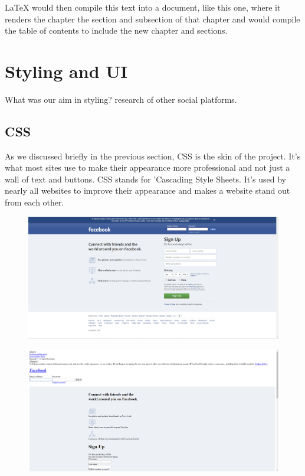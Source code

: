 LaTeX would then compile this text into a document, like this one, where it renders the chapter the section and subsection of that chapter and would compile the table of contents to include the new chapter and sections.

\section{Styling and UI}
What was our aim in styling? research of other social platforms.

\subsection{CSS}
As we discussed briefly in the previous section, CSS is the  skin of the project. It's what most sites use to make their appearance more professional and not just a wall of text and buttons. CSS stands for 'Cascading Style Sheets. It's used by nearly all websites to improve their appearance and makes a website stand out from each other.

\begin{figure}[H]
    \centering
    \begin{minipage}{.50\textwidth}
      \centering
      \includegraphics[width=.9\linewidth]{img/facebookCSS.PNG}
      \label{fig:aboutPC}
    \end{minipage}%
    \begin{minipage}{.50\textwidth}
      \centering
      \includegraphics[width=.9\linewidth]{img/facebookNoCSS.PNG}
      \label{fig:aboutMobile}
    \end{minipage}
\end{figure}

